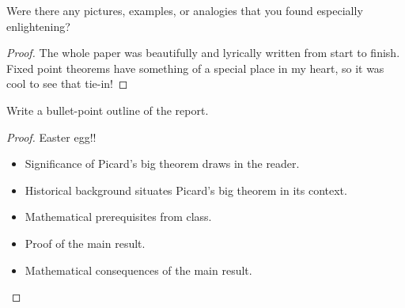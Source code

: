 \documentclass[../finalProject.tex]{subfiles}
\begin{document}
\noindent Were there any pictures, examples, or analogies that you found especially enlightening?
\begin{proof}
    The whole paper was beautifully and lyrically written from start to finish. Fixed point theorems have something of a special place in my heart, so it was cool to see that tie-in!
\end{proof}
\vspace{3em}

\noindent Write a bullet-point outline of the report.
\begin{proof}
    {\color{white}Easter egg!!}
    \begin{itemize}
        \item Significance of Picard's big theorem draws in the reader.
        \item Historical background situates Picard's big theorem in its context.
        \item Mathematical prerequisites from class.
        \item Proof of the main result.
        \item Mathematical consequences of the main result.
    \end{itemize}
\end{proof}
\end{document}
